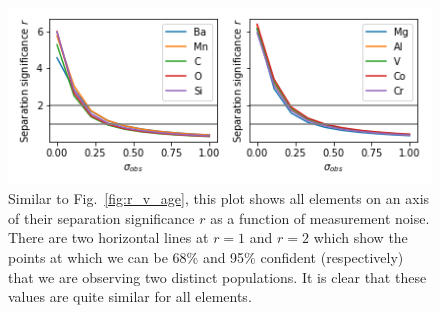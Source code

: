 \documentclass[fleqn,usenatbib]{mnras}
\begin{document}


\begin{figure}
	\includegraphics[width=\columnwidth]{figures/same_axis_r_sigma.png}
    \caption{Similar to Fig.~\ref{fig:r_v_age}, this plot shows all elements on an axis of their separation significance $r$ as a function of measurement noise. There are two horizontal lines at $r=1$ and $r=2$ which show the points at which we can be 68\% and 95\% confident (respectively) that we are observing two distinct populations. It is clear that these values are quite similar for all elements.}
    \label{fig:r_v_obs}
\end{figure}
\end{document}
